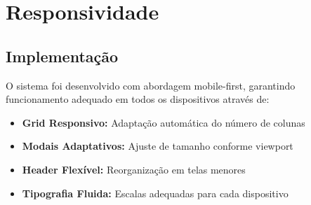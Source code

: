 \documentclass[12pt,a4paper]{article}
\begin{document}
\section{Responsividade}

\subsection{Implementação}
O sistema foi desenvolvido com abordagem mobile-first, garantindo funcionamento adequado em todos os dispositivos através de:

\begin{itemize}
    \item \textbf{Grid Responsivo:} Adaptação automática do número de colunas
    \item \textbf{Modais Adaptativos:} Ajuste de tamanho conforme viewport
    \item \textbf{Header Flexível:} Reorganização em telas menores
    \item \textbf{Tipografia Fluida:} Escalas adequadas para cada dispositivo
\end{itemize}
\end{document}
